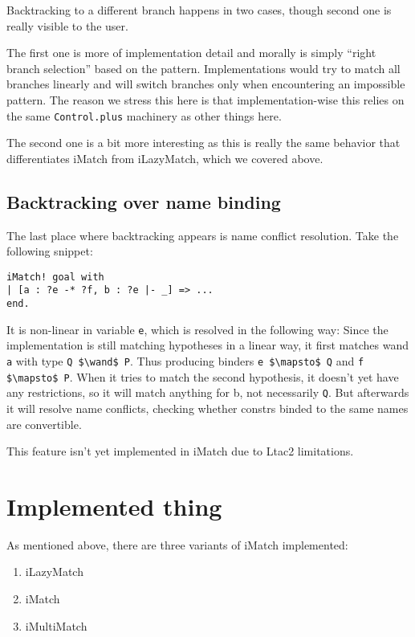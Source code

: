 Backtracking to a different branch happens in two cases, though second one is really visible to the user.

The first one is more of implementation detail and morally is simply ``right branch selection'' based on the pattern.
Implementations would try to match all branches linearly and will switch branches only when encountering an impossible pattern.
The reason we stress this here is that implementation-wise this relies on the same \verb|Control.plus| machinery as other things here.

The second one is a bit more interesting as this is really the same behavior that differentiates iMatch from iLazyMatch, which we covered above.

\subsection{Backtracking over name binding}

The last place where backtracking appears is name conflict resolution.
Take the following snippet:

\begin{lstlisting}[language=caml]
iMatch! goal with
| [a : ?e -* ?f, b : ?e |- _] => ...
end.
\end{lstlisting}

It is non-linear in variable \verb|e|, which is resolved in the following way:
Since the implementation is still matching hypotheses in a linear way, it first matches wand \verb|a| with type \verb|Q $\wand$ P|.
Thus producing binders \verb|e $\mapsto$ Q| and \verb|f $\mapsto$ P|.
When it tries to match the second hypothesis, it doesn't yet have any restrictions, so it will match anything for b, not necessarily \verb|Q|.
But afterwards it will resolve name conflicts, checking whether constrs binded to the same names are convertible.

This feature isn't yet implemented in iMatch due to Ltac2 limitations.

\section{Implemented thing}

As mentioned above, there are three variants of iMatch implemented:
\begin{enumerate}
\item iLazyMatch
\item iMatch
\item iMultiMatch
\end{enumerate}

